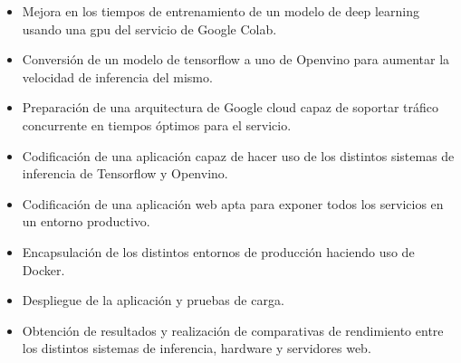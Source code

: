 \begin{itemize}
    \item Mejora en los tiempos de entrenamiento de un modelo de deep learning usando una gpu del servicio de Google Colab.
    \item Conversión de un modelo de tensorflow a uno de Openvino para aumentar la velocidad de inferencia del mismo.
    \item Preparación de una arquitectura de Google cloud capaz de soportar tráfico concurrente en tiempos óptimos para el servicio.
    \item Codificación de una aplicación capaz de hacer uso de los distintos sistemas de inferencia de Tensorflow y Openvino.
    \item Codificación de una aplicación web apta para exponer todos los servicios en un entorno productivo.
    \item Encapsulación de los distintos entornos de producción haciendo uso de Docker.
    \item Despliegue de la aplicación y pruebas de carga.
    \item Obtención de resultados y realización de comparativas de rendimiento entre los distintos sistemas de inferencia, hardware y servidores web.
\end{itemize}


